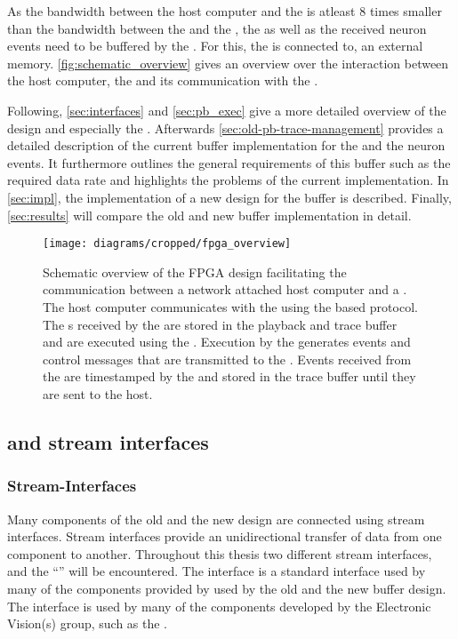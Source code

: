 As the bandwidth between the host computer and the \FPGA{} is atleast $\num{8}$ times smaller than the bandwidth between the \FPGA{} and the \ASIC{}, the \PlaybackProgram{} as well as the received neuron events need to be buffered by the \FPGA{}. For this, the \FPGA{} is connected to, an external \DDRSIZE{} \DDR{} memory.
\autoref{fig:schematic_overview} gives an overview over the interaction between the host computer, the \FPGA{} and its communication with the \HICANNX{}.

Following, \autoref{sec:interfaces} and \autoref{sec:pb_exec} give a more detailed overview of the \FPGA{} design and especially the \pbexec{}. Afterwards \autoref{sec:old-pb-trace-management} provides a detailed description of the current buffer implementation for the \PlaybackProgram{} and the neuron events. It furthermore outlines the general requirements of this buffer such as the required data rate and highlights the problems of the current implementation. In \autoref{sec:impl}, the implementation of a new design for the buffer is described. Finally, \autoref{sec:results} will compare the old and new buffer implementation in detail.

\begin{figure}
\centerline{\texttt{[image: diagrams/cropped/fpga\_overview]}}
\caption{Schematic overview of the FPGA design facilitating the communication between a network attached host computer and a \HICANNX{}. The host computer communicates with the \FPGA{} using the \UDP{} based \HostARQ{} protocol. The \PlaybackProgram{}s received by the \FPGA{} are stored in the playback and trace buffer and are executed using the \pbexec{}. Execution by the \pbexec{} generates events and control messages that are transmitted to the \ASIC{}. Events received from the \ASIC{} are timestamped by the \pbexec{} and stored in the trace buffer until they are sent to the host.}\label{fig:schematic_overview}
\end{figure}


\subsection{\AXI{} and stream interfaces}\label{sec:interfaces}
\subsubsection{Stream-Interfaces}
Many components of the old and the new \FPGA{} design are connected using stream interfaces. Stream interfaces provide an unidirectional transfer of data from one component to another.
Throughout this thesis two different stream interfaces, \AXIStream{} and the ``\ValidNextStream{}'' will be encountered.
The \AXIStream{} interface is a standard interface used by many of the components provided by \Xilinx{} used by the old and the new buffer design. The \ValidNextStream{} interface is used by many of the components developed by the Electronic Vision(s) group, such as the \pbexec{}.

